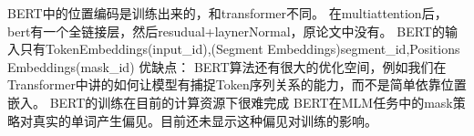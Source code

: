 BERT中的位置编码是训练出来的，和transformer不同。
在multiattention后，bert有一个全链接层，然后resudual+laynerNormal，原论文中没有。
BERT的输入只有TokenEmbeddings(input_id),(Segment Embeddings)segment_id,Positions Embeddings(mask_id)
优缺点：
BERT算法还有很大的优化空间，例如我们在Transformer中讲的如何让模型有捕捉Token序列关系的能力，而不是简单依靠位置嵌入。
BERT的训练在目前的计算资源下很难完成
BERT在MLM任务中的mask策略对真实的单词产生偏见。目前还未显示这种偏见对训练的影响。